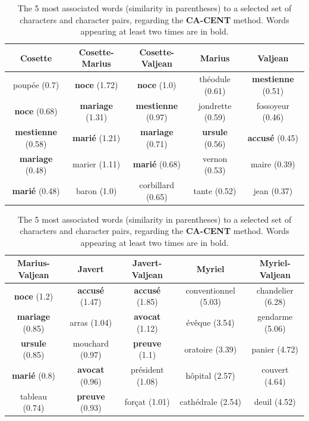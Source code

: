 \documentclass[
twocolumn,
]{ceurart}
\begin{document}
\begin{table}[!bh]
	\centering
	\begin{tabular}{|c|c|c|c|c|}
		\hline
		Cosette & Cosette-Marius & Cosette-Valjean & Marius & Valjean \\ \hline
		poupée (0.7) & \textbf{noce} (1.72) & \textbf{noce} (1.0) & théodule (0.61) & \textbf{mestienne} (0.51) \\ \hline
		\textbf{noce} (0.68) & \textbf{mariage} (1.31) & \textbf{mestienne} (0.97) & jondrette (0.59) & fossoyeur (0.46) \\ \hline
		\textbf{mestienne} (0.58) & \textbf{marié} (1.21) & \textbf{mariage} (0.71) & \textbf{ursule} (0.56) & \textbf{accusé} (0.45) \\ \hline
		\textbf{mariage} (0.48) & marier (1.11) & \textbf{marié} (0.68) & vernon (0.53) & maire (0.39) \\ \hline
		\textbf{marié} (0.48) & baron (1.0) & corbillard (0.65) & tante (0.52) & jean (0.37) \\ 
		\hline
	\end{tabular}

	\begin{tabular}{|c|c|c|c|c|}
		\hline
		Marius-Valjean & Javert & Javert-Valjean & Myriel & Myriel-Valjean \\ \hline
		\textbf{noce} (1.2) & \textbf{accusé} (1.47) & \textbf{accusé} (1.85) & conventionnel (5.03) & chandelier (6.28) \\ \hline
		\textbf{mariage} (0.85) & arras (1.04) & \textbf{avocat} (1.12) & évêque (3.54) & gendarme (5.06) \\ \hline
		\textbf{ursule} (0.85) & mouchard (0.97) & \textbf{preuve} (1.1) & oratoire (3.39) & panier (4.72) \\ \hline
		\textbf{marié} (0.8) & \textbf{avocat} (0.96) & président (1.08) & hôpital (2.57) & couvert (4.64) \\ \hline
		tableau (0.74) & \textbf{preuve} (0.93) & forçat (1.01) & cathédrale (2.54) & deuil (4.52) \\ \hline
	\end{tabular}
	
	\label{CA_CENT_word_vs_obj}
	\caption{The 5 most associated words (similarity in parentheses) to a selected set of characters and character pairs, regarding the \textbf{CA-CENT} method. Words appearing at least two times are in bold.}
\end{table}
\end{document}
